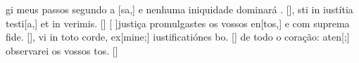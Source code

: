 {    {gi meus passos segundo a [sa,] e nenhuma iniquidade dominará . [\LinkPT]},
  {sti in iustítia testi[a,] et in verimis. [\LinkLA]}%
    {[ ]{jus}tiça promulgastes os vossos en[tos,] e com suprema fide. [\LinkPT]},
  {vi in toto corde, ex[mine;] iustificatiónes bo. [\LinkLA]}%
    { de todo o coração: aten[;] observarei os vossos tos. [\LinkPT]}
}